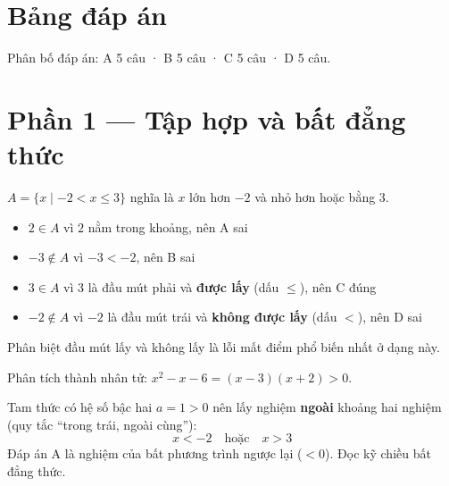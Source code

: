 \documentclass[11pt, a4paper]{article}
\begin{document}

\section*{Bảng đáp án}


\vspace{0.2cm}
\noindent Phân bố đáp án: A 5 câu · B 5 câu · C 5 câu · D 5 câu.

\section{Phần 1 — Tập hợp và bất đẳng thức}

\begin{dapan}[1 — Đáp án C]
$A=\{x \mid -2<x\le 3\}$ nghĩa là $x$ lớn hơn $-2$ và nhỏ hơn hoặc bằng $3$.

\begin{itemize}[leftmargin=1.4em, itemsep=2pt]
\item $2 \in A$ vì $2$ nằm trong khoảng, nên A sai
\item $-3 \notin A$ vì $-3 < -2$, nên B sai
\item $3 \in A$ vì $3$ là đầu mút phải và \textbf{được lấy} (dấu $\le$), nên C đúng
\item $-2 \notin A$ vì $-2$ là đầu mút trái và \textbf{không được lấy} (dấu $<$), nên D sai
\end{itemize}

 Phân biệt đầu mút lấy và không lấy là lỗi mất điểm phổ biến nhất ở dạng này.
\end{dapan}

\begin{dapan}[2 — Đáp án B]
Phân tích thành nhân tử: $x^2-x-6=(x-3)(x+2)>0$.

Tam thức có hệ số bậc hai $a=1>0$ nên lấy nghiệm \textbf{ngoài} khoảng hai nghiệm (quy tắc ``trong trái, ngoài cùng''):
\[
x<-2 \quad \text{hoặc} \quad x>3
\]
 Đáp án A là nghiệm của bất phương trình ngược lại ($<0$). Đọc kỹ chiều bất đẳng thức.
\end{dapan}
\end{document}
